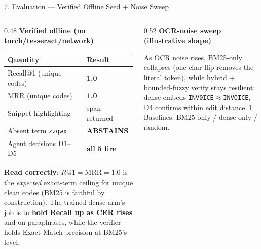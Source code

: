 \documentclass[10pt,aspectratio=169]{beamer}
\begin{document}
\begin{frame}{7. Evaluation --- Verified Offline Seed + Noise Sweep}
\begin{columns}[T]
\begin{column}{0.48\textwidth}
\textbf{Verified offline (no torch/tesseract/network)}
\begin{table}[h]
\centering\scriptsize
\begin{tabular}{ll}
\toprule
\textbf{Quantity} & \textbf{Result} \\
\midrule
Recall@1 (unique codes) & \textbf{1.0} \\
MRR (unique codes) & \textbf{1.0} \\
Snippet highlighting & span returned \\
Absent term \texttt{zzqwx} & \textbf{ABSTAINS} \\
Agent decisions D1--D5 & \textbf{all 5 fire} \\
\bottomrule
\end{tabular}
\end{table}
\scriptsize \textbf{Read correctly}: $R@1{=}\text{MRR}{=}1.0$ is the \emph{expected} exact-term ceiling for unique clean codes (BM25 is faithful by construction). The trained dense arm's job is to \textbf{hold Recall up as CER rises} and on paraphrases, while the verifier holds Exact-Match precision at BM25's level.
\end{column}
\begin{column}{0.52\textwidth}
\textbf{OCR-noise sweep (illustrative shape)}
\begin{center}
\end{center}
\scriptsize As OCR noise rises, BM25-only collapses (one char flip removes the literal token), while hybrid + bounded-fuzzy verify stays resilient: dense embeds \texttt{INV0ICE}$\approx$\texttt{INVOICE}, D4 confirms within edit distance~1. Baselines: BM25-only / dense-only / random.
\end{column}
\end{columns}
\end{frame}
\end{document}
